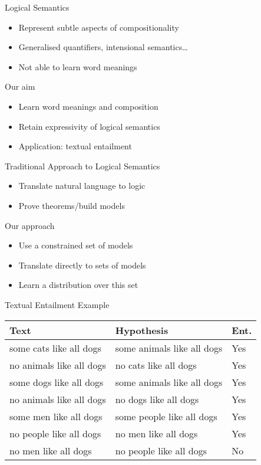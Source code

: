 \documentclass{beamer}
\newlength{\wideitemsep}
\let\olditem\item
\renewcommand{\item}{\setlength{\itemsep}{\wideitemsep}\olditem}
\begin{document}
\begin{frame}{Logical Semantics}
\begin{itemize}
\item Represent subtle aspects of compositionality
\item Generalised quantifiers, intensional semantics\ldots
\item Not able to learn word meanings
\end{itemize}
\end{frame}

\begin{frame}{Our aim}
\begin{itemize}
\item Learn word meanings and composition
\item Retain expressivity of logical semantics
\item Application: textual entailment
\end{itemize}
\end{frame}

\begin{frame}{Traditional Approach to Logical Semantics}
\begin{itemize}
\item Translate natural language to logic
\item Prove theorems/build models
\end{itemize}
\end{frame}

\begin{frame}{Our approach}
\begin{itemize}
\item Use a constrained set of models
\item Translate directly to sets of models
\item Learn a distribution over this set
\end{itemize}
\end{frame}

\begin{frame}{Textual Entailment Example}
\begin{tabular}{|l|l|l|}
\hline
Text & Hypothesis & Ent.\\
\hline
some cats like all dogs & some animals like all dogs & Yes\\
no animals like all dogs & no cats like all dogs & Yes\\
some dogs like all dogs & some animals like all dogs & Yes\\
no animals like all dogs & no dogs like all dogs & Yes\\
some men like all dogs & some people like all dogs & Yes\\
\hline
no people like all dogs & no men like all dogs & Yes\\
no men like all dogs & no people like all dogs & No\\
\hline
\end{tabular}
\end{frame}
\end{document}
